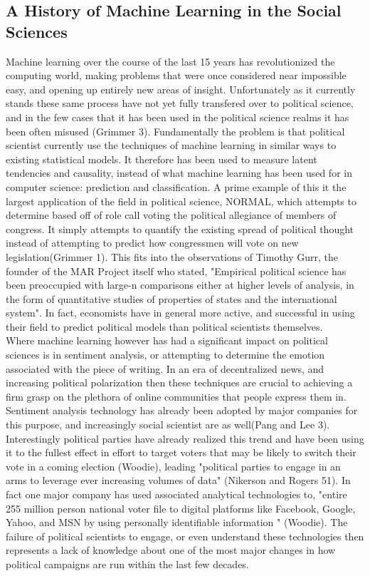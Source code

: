 \documentclass[12pt]{article}
\begin{document}
\subsection{A History of Machine Learning in the Social Sciences}

	Machine learning over the course of the last 15 years has revolutionized the computing world, making problems that were once considered near impossible easy, and opening up entirely new areas of insight. Unfortunately as it currently stands these same process have not yet fully transfered over to political science, and in the few cases that it has been used in the political science realms it has been often misused (Grimmer 3). Fundamentally the problem is that political scientist currently use the techniques of machine learning in similar ways to existing statistical models. It therefore has been used to measure latent tendencies and causality, instead of what machine learning has been used for in computer science: prediction and classification. A prime example of this it the largest application of the field in political science, NORMAL,  which attempts to determine based off of role call voting the political allegiance of members of congress. It simply attempts to quantify the existing spread of political thought instead of attempting to predict how congressmen will vote on new legislation(Grimmer 1). This fits into the observations of Timothy Gurr, the founder of the MAR Project itself who stated, {"Empirical political science has been preoccupied with large-n comparisons either at higher levels of analysis, in the form of quantitative studies of properties of states and the international system"}. In fact, economists have in general more active, and successful in using their field to predict political models than political scientists themselves. \\

	Where machine learning however has had a significant impact on political sciences is in sentiment analysis, or attempting to determine the emotion associated with the piece of writing. In an era of decentralized news, and increasing political polarization then these techniques are crucial to achieving a firm grasp on the plethora of online communities that people express them in. Sentiment analysis technology has already been adopted by major companies for this purpose, and increasingly social scientist are as well(Pang and Lee 3). Interestingly political parties have already realized this trend and have been using it to the fullest effect in effort to target voters that may be likely to switch their vote in a coming election (Woodie), leading {"political parties to engage in an arms to leverage ever increasing volumes of data"} (Nikerson and Rogers 51). In fact one major company has used associated analytical technologies to, {"entire 255 million person national voter file to digital platforms like Facebook, Google, Yahoo, and MSN by using personally identifiable information "} (Woodie). The failure of political scientists to engage, or even understand these technologies then represents a lack of knowledge about one of the most major changes in how political campaigns are run within the last few decades. \\
\end{document}
